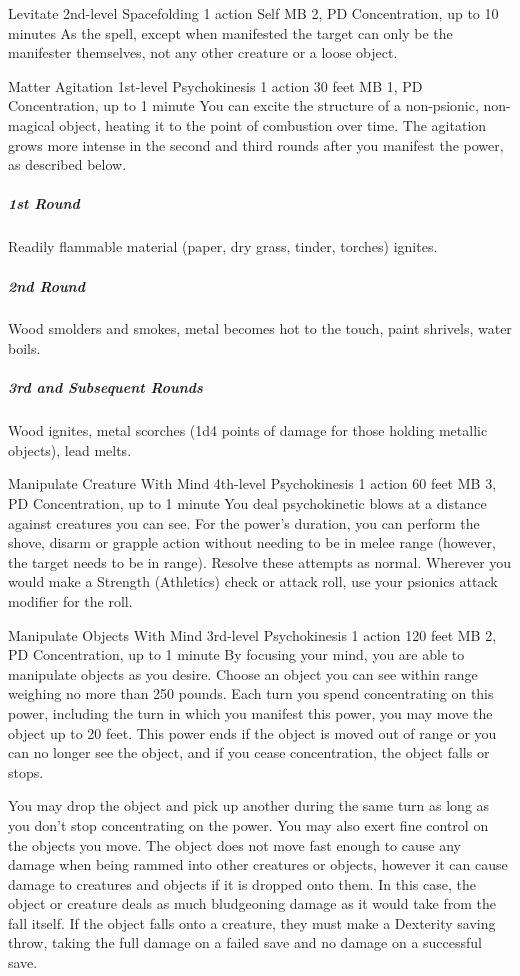 \DndPowerHeader%
  {Levitate}
  {2nd-level Spacefolding}
  {1 action}
  {Self}
  {MB 2, PD \lvltwo}
  {Concentration, up to 10 minutes}
As the  spell,
except when manifested the target can only be the manifester themselves,
not any other creature or a loose object.

\DndPowerHeader%
  {Matter Agitation}
  {1st-level Psychokinesis}
  {1 action}
  {30 feet}
  {MB 1, PD \lvlone}
  {Concentration, up to 1 minute}
  You can excite the structure of a non-psionic,
  non-magical object,
  heating it to the point of combustion over time.
  The agitation grows more intense in the second and third rounds
  after you manifest the power, as described below.

  \subparagraph{1st Round}
    Readily flammable material
    (paper, dry grass, tinder, torches) ignites.
  \subparagraph{2nd Round}
    Wood smolders and smokes,
    metal becomes hot to the touch,
    paint shrivels, water boils.
  \subparagraph{3rd and Subsequent Rounds}
    Wood ignites, metal scorches
    (1d4 points of damage for those holding metallic objects),
    lead melts.

\DndPowerHeader%
  {Manipulate Creature With Mind}
  {4th-level Psychokinesis}
  {1 action}
  {60 feet}
  {MB 3, PD \lvlfour}
  {Concentration, up to 1 minute}
You deal psychokinetic blows at a distance
against creatures you can see.
For the power's duration,
you can perform the shove, disarm or grapple action
without needing to be in melee range
(however, the target needs to be in range).
Resolve these attempts as normal.
Wherever you would make a Strength (Athletics) check or attack roll,
use your psionics attack modifier for the roll.
  
  \DndPowerHeader%
    {Manipulate Objects With Mind}
    {3rd-level Psychokinesis}
    {1 action}
    {120 feet}
    {MB 2, PD \lvlthree}
    {Concentration, up to 1 minute}
  By focusing your mind, you are able to manipulate objects as you desire.
  Choose an object you can see within range
  weighing no more than 250 pounds.
  Each turn you spend concentrating on this power,
  including the turn in which you manifest this power,
  you may move the object up to 20 feet.
  This power ends if the object is moved out of range
  or you can no longer see the object,
  and if you cease concentration,
  the object falls or stops.

  You may drop the object and pick up another during
  the same turn as long as you don't stop concentrating
  on the power.
  You may also exert fine control on the objects you move.
  The object does not move fast enough to cause any damage
  when being rammed into other creatures or objects,
  however it can cause damage to creatures and objects
  if it is dropped onto them.
  In this case, the object or creature deals as much
  bludgeoning damage as it would take from the fall itself.
  If the object falls onto a creature,
  they must make a Dexterity saving throw, taking the full
  damage on a failed save and no damage on a successful save.

